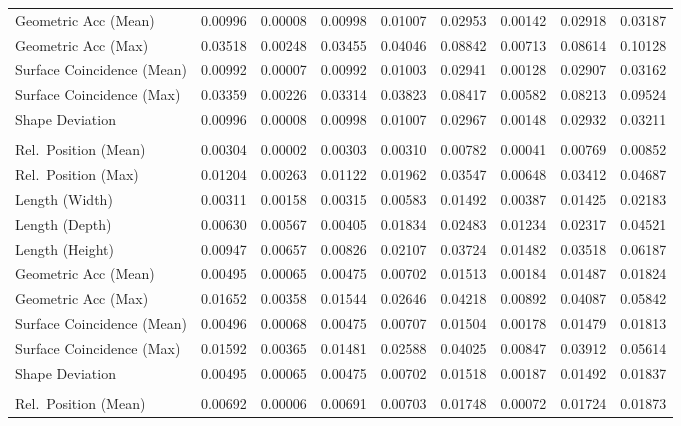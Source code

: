 \documentclass{ieeeaccess}
\begin{document}
\begin{table}[t]
\begin{tabular}{
      >{\raggedright\arraybackslash}p{3.0cm}
      S S S S
      S S S S
  }
    Geometric Acc (Mean)      & 0.00996 & 0.00008 & 0.00998 & 0.01007  & 0.02953 & 0.00142 & 0.02918 & 0.03187 \\
    Geometric Acc (Max)       & 0.03518 & 0.00248 & 0.03455 & 0.04046  & 0.08842 & 0.00713 & 0.08614 & 0.10128 \\
    Surface Coincidence (Mean)& 0.00992 & 0.00007 & 0.00992 & 0.01003  & 0.02941 & 0.00128 & 0.02907 & 0.03162 \\
    Surface Coincidence (Max) & 0.03359 & 0.00226 & 0.03314 & 0.03823  & 0.08417 & 0.00582 & 0.08213 & 0.09524 \\
    Shape Deviation           & 0.00996 & 0.00008 & 0.00998 & 0.01007  & 0.02967 & 0.00148 & 0.02932 & 0.03211 \\
    \midrule
     \\
    Rel.\ Position (Mean)    & 0.00304 & 0.00002 & 0.00303 & 0.00310  & 0.00782 & 0.00041 & 0.00769 & 0.00852 \\
    Rel.\ Position (Max)     & 0.01204 & 0.00263 & 0.01122 & 0.01962  & 0.03547 & 0.00648 & 0.03412 & 0.04687 \\
    Length (Width)            & 0.00311 & 0.00158 & 0.00315 & 0.00583  & 0.01492 & 0.00387 & 0.01425 & 0.02183 \\
    Length (Depth)            & 0.00630 & 0.00567 & 0.00405 & 0.01834  & 0.02483 & 0.01234 & 0.02317 & 0.04521 \\
    Length (Height)           & 0.00947 & 0.00657 & 0.00826 & 0.02107  & 0.03724 & 0.01482 & 0.03518 & 0.06187 \\
    Geometric Acc (Mean)      & 0.00495 & 0.00065 & 0.00475 & 0.00702  & 0.01513 & 0.00184 & 0.01487 & 0.01824 \\
    Geometric Acc (Max)       & 0.01652 & 0.00358 & 0.01544 & 0.02646  & 0.04218 & 0.00892 & 0.04087 & 0.05842 \\
    Surface Coincidence (Mean)& 0.00496 & 0.00068 & 0.00475 & 0.00707  & 0.01504 & 0.00178 & 0.01479 & 0.01813 \\
    Surface Coincidence (Max) & 0.01592 & 0.00365 & 0.01481 & 0.02588  & 0.04025 & 0.00847 & 0.03912 & 0.05614 \\
    Shape Deviation           & 0.00495 & 0.00065 & 0.00475 & 0.00702  & 0.01518 & 0.00187 & 0.01492 & 0.01837 \\
    \midrule
     \\
    Rel.\ Position (Mean)    & 0.00692 & 0.00006 & 0.00691 & 0.00703  & 0.01748 & 0.00072 & 0.01724 & 0.01873 \\

\end{tabular}
\end{table}
\end{document}
